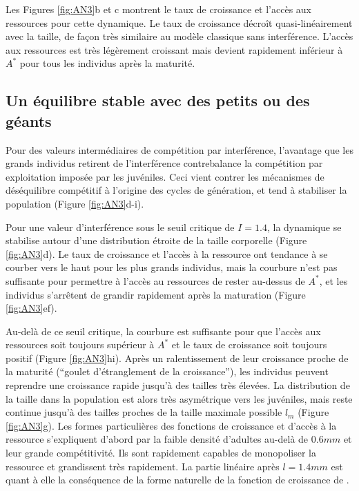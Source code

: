Les Figures \ref{fig:AN3}b et c montrent le taux de croissance et l'accès aux
ressources pour cette dynamique. Le taux de croissance décroît
quasi-linéairement avec la taille, de façon très similaire au modèle classique
sans interférence. L'accès aux ressources est très légèrement croissant mais
devient rapidement inférieur à $A^*$ pour tous les individus après la maturité. 

\subsection{Un équilibre stable avec des petits ou des géants}

Pour des valeurs intermédiaires de compétition par interférence, l'avantage
que les grands individus retirent de l'interférence contrebalance la compétition
par exploitation imposée par les juvéniles. Ceci vient contrer les mécanismes
de déséquilibre compétitif à l'origine des cycles de génération, et tend à
stabiliser la population (Figure \ref{fig:AN3}d-i).

Pour une valeur d'interférence sous le seuil critique de $I=1.4$, la dynamique
se stabilise autour d'une distribution étroite de la taille corporelle (Figure
\ref{fig:AN3}d). Le taux de croissance et l'accès à la ressource ont tendance à
se courber vers le haut pour les plus grands individus, mais la courbure n'est
pas suffisante pour permettre à l'accès au ressources de rester au-dessus de
$A^*$, et les individus s'arrêtent de grandir rapidement après la maturation (Figure
\ref{fig:AN3}ef).

Au-delà de ce seuil critique, la courbure est suffisante pour que l'accès aux
ressources soit toujours supérieur à $A^*$ et le taux de croissance soit
toujours positif (Figure \ref{fig:AN3}hi). Après un ralentissement de leur
croissance proche de la maturité (``goulet d'étranglement de la croissance''),
les individus peuvent reprendre une croissance rapide jusqu'à des tailles très
élevées. La distribution de la taille dans la population est alors très
asymétrique vers les juvéniles, mais reste continue jusqu'à des tailles proches
de la taille maximale possible $l_m$ (Figure \ref{fig:AN3}g). Les formes
particulières des fonctions de croissance et d'accès à la ressource s'expliquent
d'abord par la faible densité d'adultes au-delà de $0.6mm$ et leur grande
compétitivité. Ils sont rapidement capables de monopoliser la ressource et
grandissent très rapidement. La partie linéaire après $l=1.4mm$ est quant à elle
la conséquence de la forme naturelle de la fonction de croissance de
\textcites{bertalanffy1957a}.

